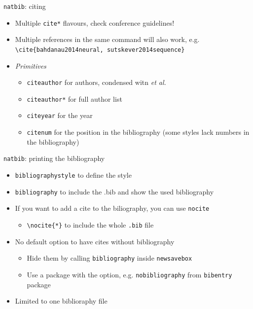 \documentclass[english]{beamer}
\let\olditem\item
\renewcommand{\item}{\setlength{\itemsep}{\fill}\olditem}
\newenvironment{sitemize}{\let\item\olditem \begin{itemize}}{\vfill\end{itemize}}
\let\textttt\texttt
\renewcommand{\texttt}[1]{\colorbox{gray!10}{\textttt{#1}}}
\begin{document}
\begin{frame}[fragile]{\texttt{natbib}: citing}
\begin{itemize}
    \item Multiple \texttt{cite*} flavours, check conference guidelines!
    \item Multiple references in the same command will also work, e.g. \verb|\cite{bahdanau2014neural, sutskever2014sequence}|
    \item \textit{Primitives}
    \begin{sitemize}
        \item[\texttt{citeauthor}] for authors, condensed witn \textit{et al.}
        \item[\texttt{citeauthor*}] for full author list
        \item[\texttt{citeyear}] for the year
        \item[\texttt{citenum}] for the position in the bibliography (some styles lack numbers in the bibliography)
    \end{sitemize}
\end{itemize}
\end{frame}

\begin{frame}[fragile]{\texttt{natbib}: printing the bibliography}
\begin{itemize}
    \item \texttt{bibliographystyle} to define the style
    \item \texttt{bibliography} to include the .bib and show the used bibliography
    \item If you want to add a cite to the biliography, you can use \texttt{nocite}
    \begin{sitemize}
        \item \verb|\nocite{*}| to include the whole \texttt{.bib} file
    \end{sitemize}
    \item No default option to have cites without bibliography
    \begin{sitemize}
        \item Hide them by calling \texttt{bibliography} inside \texttt{newsavebox} 
        \item Use a package with the option, e.g. \texttt{nobibliography} from \texttt{bibentry} package
    \end{sitemize}
    \item Limited to one biblioraphy file
\end{itemize}
\end{frame}
\end{document}
